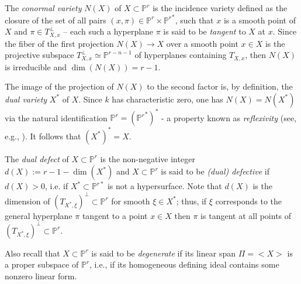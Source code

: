 \documentclass[11pt]{article}   %
\theoremstyle{definition}
\numberwithin{Theorem}{section} \numberwithin{equation}{section}
\newcommand{\rar}{\rightarrow}
\newcommand{\Proj}{{\mathbb P}}
\newcommand{\p}{{\mathbb P}}
\begin{document}
The {\it conormal variety\/} $N(X)$ of $X\subset \Proj^ r$ is the
incidence variety defined as the closure of the set of all pairs
$(x,\pi)\in \p^ r\times{ \p^r}^  *$, such that $x$ is a smooth point
of $X$ and $\pi\in T_{X,x}^ \perp$ -- each such a hyperplane $\pi$
is said to be {\it tangent\/} to $X$ at $x$. Since the fiber of the
first projection $N(X)\rar X$ over a smooth point $x\in X$ is the
projective subspace $T_{X,x}^\perp\simeq \p^{r-n-1}$ of
hyperplanes containing $T_{X,x}$, then {$N(X)$ is irreducible and} $\dim(N(X))=r-1$.

The image of the projection of $N(X)$ to the second factor is, by
definition, the {\it dual variety} $X^ *$ of $X$. Since $k$ has
characteristic zero, one has $N(X)=N(X^ *)$ via the natural
identification  $\p^ r = ({\p^r}^*)^ *$ - a property known as {\it
reflexivity} (see, e.g., \cite{Kleiman}). It
follows  that $(X^*)^*=X$.


The {\it dual defect\/} of $X\subset\p^r$ is the non-negative integer
$d(X):=r-1-\dim(X^ *)$ and $X\subset\p^r$ is said to be {\it (dual) defective} if $d(X)>0$, i.e. if
$X^*\subset\p^{r*}$ is not a hypersurface. Note that $d(X)$ is the dimension of
$(T_{X^*,\xi})^ \perp\subset \p^r$ for smooth $\xi\in X^*$; thus, if
$\xi$ corresponds to the general hyperplane $\pi$ tangent to a
point $x\in X$ then $\pi$ is tangent at all points of
$(T_{X^*,\xi})^ \perp\subset \p^r$.



 {Also recall that
$X\subset \p^ r$ is said to be {\it degenerate\/} if its linear span
$\Pi=<X>$ is a proper subspace of $\p^ r$, i.e., if its homogeneous
defining ideal contains some nonzero linear form.}
\end{document}
